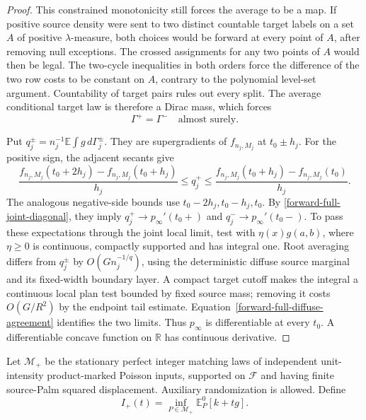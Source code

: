 \documentclass[11pt,reqno]{amsart}
\theoremstyle{definition}
\theoremstyle{remark}
\numberwithin{equation}{section}
\newcommand{\R}{\mathbb R}
\newcommand{\E}{\mathbb E}
\begin{document}
\begin{proof}
This constrained monotonicity still forces the average to be a map. If
positive source density were sent to two distinct countable target labels
on a set \(A\) of positive \(\lambda\)-measure, both choices would
be forward at every point of \(A\), after removing null exceptions.
The crossed assignments for any two points of \(A\) would then be
legal. The two-cycle inequalities in both orders force the difference of
the two row costs to be constant on \(A\), contrary to the polynomial
level-set argument. Countability of target pairs rules out every split.
The average conditional target law is therefore a Dirac mass, which forces
\begin{equation}
\label{forward-full-diffuse-agreement}
                     \Gamma^+=\Gamma^-\quad\text{almost surely}.
\end{equation}

Put \(q_j^\pm=n_j^{-1}\E\int g\,d\Gamma_j^\pm\).
They are supergradients of \(f_{n_j,M_j}\) at \(t_0\pm h_j\).
For the positive sign, the adjacent secants give
\[
 \frac{f_{n_j,M_j}(t_0+2h_j)-f_{n_j,M_j}(t_0+h_j)}{h_j}
 \le q_j^+\le
 \frac{f_{n_j,M_j}(t_0+h_j)-f_{n_j,M_j}(t_0)}{h_j}.
\]
The analogous negative-side bounds use \(t_0-2h_j,t_0-h_j,t_0\).
By \eqref{forward-full-joint-diagonal}, they imply
\(q_j^+\to p_\infty'(t_0+)\) and
\(q_j^-\to p_\infty'(t_0-)\).
To pass these expectations through the joint local limit, test with
\(\eta(x)g(a,b)\), where \(\eta\ge0\) is continuous, compactly
supported and has integral one. Root averaging differs from \(q_j^\pm\)
by \(O(Gn_j^{-1/q})\), using the deterministic diffuse source marginal
and its fixed-width boundary layer. A compact target cutoff makes the
integral a continuous local plan test bounded by fixed source mass;
removing it costs \(O(G/R^2)\) by the endpoint tail estimate.
Equation~\eqref{forward-full-diffuse-agreement} identifies the two
limits. Thus \(p_\infty\) is differentiable at every \(t_0\).
A differentiable concave function on \(\R\) has continuous derivative.
\end{proof}

Let \(\mathcal M_+\) be the stationary perfect integer matching laws
of independent unit-intensity product-marked Poisson inputs, supported on
\(\mathcal F\) and having finite source-Palm squared displacement.
Auxiliary randomization is allowed. Define
\[
 I_+(t)=\inf_{P\in\mathcal M_+}\E_P^0[k+t g].
\]
\end{document}
